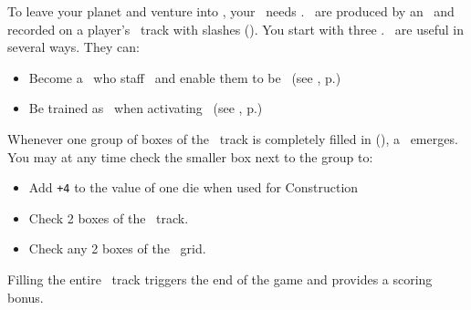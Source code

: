 To leave your planet and venture into \outerspace, your \planet\ needs \astronauts.  
\astronauts\ are produced by an \academy\ and recorded on a player's \population\ track with slashes (\gainastronautsymbol).  
You start with three \astronauts.
\newline\newline
\astronauts\ are useful in several ways. They can:
\begin{itemize}
	\item Become a \specialist\ who staff \armaments\ and enable them to be \activated\ (see , p.\pageref{sec:armaments})
	\item Be trained as \pilots\ when activating \starships\ (see , p.\pageref{sec:military})
\end{itemize}
Whenever one group of boxes of the \population\ track is completely filled in (\gainastronautsymbol), a \greatperson\ emerges.  
You may at any time check the smaller box next to the group to:
\begin{itemize}
  \item Add \texttt{+4} to the value of one die when used for Construction
  \item Check 2 boxes of the \tech\ track.
  \item Check any 2 boxes of the \culture\ grid.
\end{itemize}
Filling the entire \population\ track triggers the end of the game and provides a scoring bonus.

